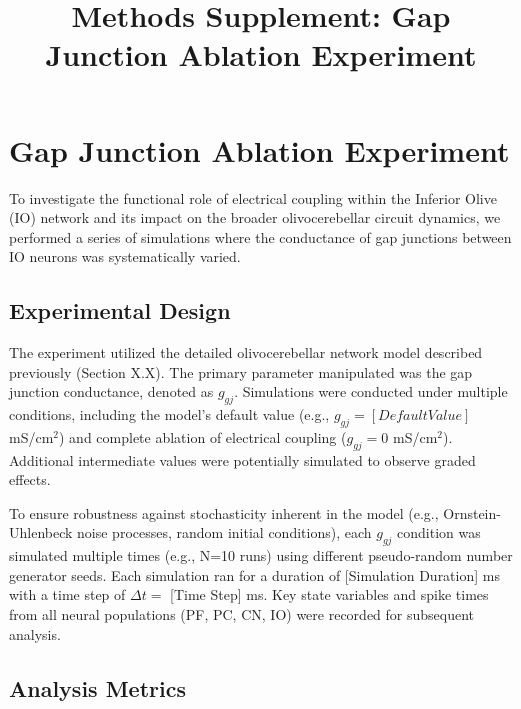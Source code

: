\documentclass{article}
\title{Methods Supplement: Gap Junction Ablation Experiment}
\author{}
\date{}
\begin{document}
\maketitle

\section{Gap Junction Ablation Experiment}

To investigate the functional role of electrical coupling within the Inferior Olive (IO) network and its impact on the broader olivocerebellar circuit dynamics, we performed a series of simulations where the conductance of gap junctions between IO neurons was systematically varied.

\subsection{Experimental Design}

The experiment utilized the detailed olivocerebellar network model described previously (Section X.X). The primary parameter manipulated was the gap junction conductance, denoted as \( g_{gj} \). Simulations were conducted under multiple conditions, including the model's default value (e.g., \( g_{gj} = [Default Value] \) mS/cm\(^2\)) and complete ablation of electrical coupling (\( g_{gj} = 0 \) mS/cm\(^2\)). Additional intermediate values were potentially simulated to observe graded effects.

To ensure robustness against stochasticity inherent in the model (e.g., Ornstein-Uhlenbeck noise processes, random initial conditions), each \( g_{gj} \) condition was simulated multiple times (e.g., N=10 runs) using different pseudo-random number generator seeds. Each simulation ran for a duration of [Simulation Duration] ms with a time step of \( \Delta t = \) [Time Step] ms. Key state variables and spike times from all neural populations (PF, PC, CN, IO) were recorded for subsequent analysis.

\subsection{Analysis Metrics}
\end{document}
